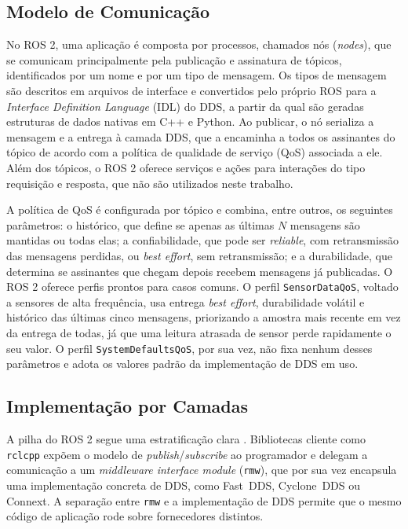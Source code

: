 \documentclass[
    12pt,
    oneside,
    a4paper,
    chapter=TITLE,
    section=TITLE,
    english,
    brazil
]{abntex2}
\begin{document}
\subsection{Modelo de Comunicação}
No ROS 2, uma aplicação é composta por processos, chamados nós
(\textit{nodes}), que se comunicam principalmente pela publicação e
assinatura de tópicos, identificados por um nome e por um tipo de
mensagem. Os tipos de mensagem são descritos em arquivos de interface e
convertidos pelo próprio ROS para a \textit{Interface Definition Language}
(IDL) do DDS, a partir da qual são geradas estruturas de dados nativas em
C++ e Python. Ao publicar, o nó serializa a mensagem e a entrega à camada
DDS, que a encaminha a todos os assinantes do tópico de acordo com a
política de qualidade de serviço (QoS) associada a ele. Além dos tópicos,
o ROS 2 oferece serviços e ações para interações do tipo requisição e
resposta, que não são utilizados neste trabalho.

A política de QoS é configurada por tópico e combina, entre outros, os
seguintes parâmetros: o histórico, que define se apenas as últimas \(N\)
mensagens são mantidas ou todas elas; a confiabilidade, que pode ser
\textit{reliable}, com retransmissão das mensagens perdidas, ou
\textit{best effort}, sem retransmissão; e a durabilidade, que determina
se assinantes que chegam depois recebem mensagens já publicadas. O ROS 2
oferece perfis prontos para casos comuns. O perfil \texttt{SensorDataQoS},
voltado a sensores de alta frequência, usa entrega \textit{best effort},
durabilidade volátil e histórico das últimas cinco mensagens, priorizando
a amostra mais recente em vez da entrega de todas, já que uma leitura
atrasada de sensor perde rapidamente o seu valor. O perfil
\texttt{SystemDefaultsQoS}, por sua vez, não fixa nenhum desses
parâmetros e adota os valores padrão da implementação de DDS em uso.

\subsection{Implementação por Camadas}
A pilha do ROS 2 segue uma estratificação clara
\cite{macenski2022ros2,maruyama2016ros2}. Bibliotecas cliente como
\texttt{rclcpp} expõem o modelo de \textit{publish}/\textit{subscribe} ao
programador e delegam a comunicação a um \textit{middleware interface
module} (\texttt{rmw}), que por sua vez encapsula uma implementação
concreta de DDS, como Fast~DDS, Cyclone~DDS ou Connext. A separação
entre \texttt{rmw} e a implementação de DDS permite que o mesmo código de
aplicação rode sobre fornecedores distintos.
\end{document}
